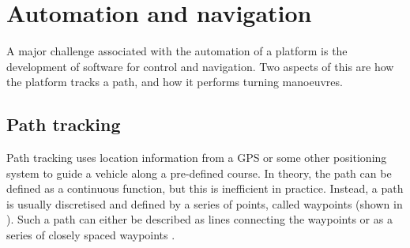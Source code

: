 \documentclass[main.tex]{subfiles}
\begin{document}
\section{Automation and navigation}
A major challenge associated with the automation of a platform is the development of software for control and navigation. Two aspects of this are how the platform tracks a path, and how it performs turning manoeuvres. 

\subsection{Path tracking}
Path tracking uses location information from a GPS or some other positioning system to guide a vehicle along a pre-defined course. In theory, the path can be defined as a continuous function, but this is inefficient in practice. Instead, a path is usually discretised and defined by a series of points, called waypoints (shown in ). Such a path can either be described as lines connecting the waypoints or as a series of closely spaced waypoints \parencite{Giesbrecht2005}.
\end{document}
